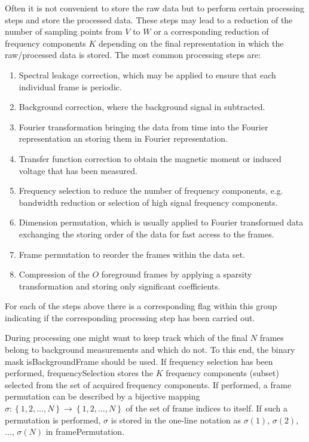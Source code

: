 \documentclass[landscape,a4paper]{article} %
\newcommand{\inlvar}[1]{{\ttfamily#1}}
\begin{document}
\begin{multicols}{2}
Often it is not convenient to store the raw data but to perform certain processing steps and store the processed data. These steps may lead to a reduction of the number of sampling points from $V$ to $W$ or a corresponding reduction of frequency components $K$ depending on the final representation in which the raw/processed data is stored. The most common processing steps are:
\begin{enumerate}
	\item Spectral leakage correction, which may be applied to ensure that each individual frame is periodic.
	\item Background correction, where the background signal in subtracted.
	\item Fourier transformation bringing the data from time into the Fourier representation an storing them in Fourier representation.
	\item Transfer function correction to obtain the magnetic moment or induced voltage that has been measured.
	\item Frequency selection to reduce the number of frequency components, e.g. bandwidth reduction or selection of high signal frequency components.
	\item Dimension permutation, which is usually applied to Fourier transformed data exchanging the storing order of the data for fast access to the frames.
	\item Frame permutation to reorder the frames within the data set.
	\item Compression of the $O$ foreground frames by applying a sparsity transformation and storing only significant coefficients.
\end{enumerate}
For each of the steps above there is a corresponding flag within this group indicating if the corresponding processing step has been carried out. 

During processing one might want to keep track which of the final $N$ frames belong to background measurements and which do not. To this end, the binary mask \inlvar{isBackgroundFrame} should be used. If frequency selection has been performed, \inlvar{frequencySelection} stores the $K$ frequency components (subset) selected from the set of acquired frequency components. If performed, a frame permutation can be described by a bijective mapping $\sigma : \left\{ 1,2,\dots,N \right\} \rightarrow \left\{ 1,2,\dots,N \right\}$ of the set of frame indices to itself. If such a permutation is performed, $\sigma$ is stored in the one-line notation as $\sigma(1)$, $\sigma(2)$, $\dots$, $\sigma(N)$ in \inlvar{framePermutation}.


\end{multicols}
\end{document}

